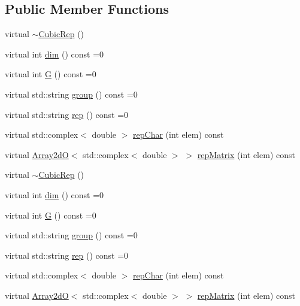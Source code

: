 \subsection*{Public Member Functions}
\begin{DoxyCompactItemize}
\item 
virtual \mbox{\hyperlink{structHadron_1_1CubicRep_a8daf9ed601e434933082fd1cc4fec396}{$\sim$\+Cubic\+Rep}} ()
\item 
virtual int \mbox{\hyperlink{structHadron_1_1CubicRep_ac178d14064f037a66af4b9fb4b312d51}{dim}} () const =0
\item 
virtual int \mbox{\hyperlink{structHadron_1_1CubicRep_a52104e43266d1614c00bbd1c3b395458}{G}} () const =0
\item 
virtual std\+::string \mbox{\hyperlink{structHadron_1_1CubicRep_a0748f11ec87f387062c8e8981339a29c}{group}} () const =0
\item 
virtual std\+::string \mbox{\hyperlink{structHadron_1_1CubicRep_ac3eb63608803d44c68681f158e14eb1b}{rep}} () const =0
\item 
virtual std\+::complex$<$ double $>$ \mbox{\hyperlink{structHadron_1_1CubicRep_af45227106e8e715e84b0af69cd3b36f8}{rep\+Char}} (int elem) const
\item 
virtual \mbox{\hyperlink{classADAT_1_1Array2dO}{Array2dO}}$<$ std\+::complex$<$ double $>$ $>$ \mbox{\hyperlink{structHadron_1_1CubicRep_ac5d7e9e6f4ab1158b5fce3e4ad9e8005}{rep\+Matrix}} (int elem) const
\item 
virtual \mbox{\hyperlink{structHadron_1_1CubicRep_a8daf9ed601e434933082fd1cc4fec396}{$\sim$\+Cubic\+Rep}} ()
\item 
virtual int \mbox{\hyperlink{structHadron_1_1CubicRep_ac178d14064f037a66af4b9fb4b312d51}{dim}} () const =0
\item 
virtual int \mbox{\hyperlink{structHadron_1_1CubicRep_a52104e43266d1614c00bbd1c3b395458}{G}} () const =0
\item 
virtual std\+::string \mbox{\hyperlink{structHadron_1_1CubicRep_a0748f11ec87f387062c8e8981339a29c}{group}} () const =0
\item 
virtual std\+::string \mbox{\hyperlink{structHadron_1_1CubicRep_ac3eb63608803d44c68681f158e14eb1b}{rep}} () const =0
\item 
virtual std\+::complex$<$ double $>$ \mbox{\hyperlink{structHadron_1_1CubicRep_af45227106e8e715e84b0af69cd3b36f8}{rep\+Char}} (int elem) const
\item 
virtual \mbox{\hyperlink{classADAT_1_1Array2dO}{Array2dO}}$<$ std\+::complex$<$ double $>$ $>$ \mbox{\hyperlink{structHadron_1_1CubicRep_ac5d7e9e6f4ab1158b5fce3e4ad9e8005}{rep\+Matrix}} (int elem) const
\end{DoxyCompactItemize}


